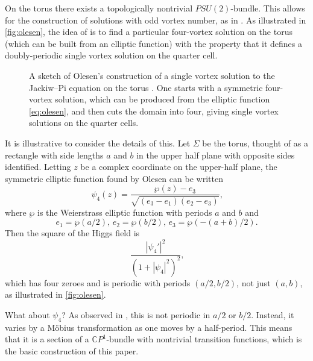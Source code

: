\documentclass[10pt]{article}
\theoremstyle{definition}
\begin{document}
On the torus there exists a topologically nontrivial \(PSU(2)\)-bundle. This allows for the construction of solutions with odd vortex number, as in \cite{olesenSC}. As illustrated in \autoref{fig:olesen}, the idea of \cite{olesenSC} is to find a particular four-vortex solution on the torus (which can be built from an elliptic function) with the property that it defines a doubly-periodic single vortex solution on the quarter cell.


\begin{figure}[ht]
\centering
{}
\caption{A sketch of Olesen's construction of a single vortex solution to the Jackiw--Pi equation on the torus \cite{olesenSC}. One starts with a symmetric four-vortex solution, which can be produced from the elliptic function \eqref{eq:olesen}, and then cuts the domain into four, giving single vortex solutions on the quarter cells.}
\label{fig:olesen}
\end{figure}

It is illustrative to consider the details of this. Let \(\Sigma\) be the torus, thought of as a rectangle with side lengths \(a\) and \(b\) in the upper half plane with opposite sides identified. Letting \(z\) be a complex coordinate on the upper-half plane, the symmetric elliptic function found by Olesen can be written 
\begin{equation}
\label{eq:olesen}
\psi_4 (z) = \frac{\wp(z) - e_3}{\sqrt{(e_3-e_1)(e_2-e_3)}}\text{,}
\end{equation}
where \(\wp\) is the Weierstrass elliptic function with periods \(a\) and \(b\) and
\begin{equation}
\label{eq:weierstrassconstants}
e_1 = \wp(a/2)\text{, } e_2 = \wp(b/2) \text{, } e_3 = \wp(-(a+b)/2) \text{.}
\end{equation}
Then the square of the Higgs field is
\[
\frac{|\psi_4'|^2}{(1+|\psi_4|^2)^2} \text{,}
\]
which has four zeroes and is periodic with periods \((a/2, b/2)\), not just \((a,b)\), as illustrated in \autoref{fig:olesen}.

What about \(\psi_4\)? As observed in \cite{olesenSC}, this is not periodic in \(a/2\) or \(b/2\). Instead, it varies by a M\"obius transformation as one moves by a half-period.
This means that it is a section of a \(\mathbb{C}P^1\)-bundle with nontrivial transition functions, which is the basic construction of this paper.
\end{document}
